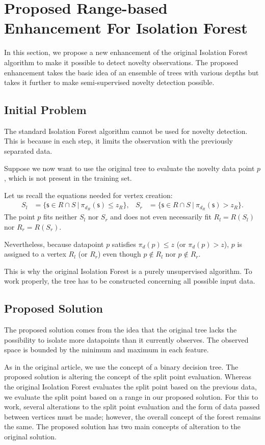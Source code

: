 \section{Proposed Range-based Enhancement For Isolation Forest}
\label{sec:novelty_isolation_forest}
In this section, we propose a new enhancement of the original Isolation Forest algorithm to make it possible to detect novelty observations.
The proposed enhancement takes the basic idea of an ensemble of trees with various depths but takes it further to make semi-supervised novelty detection possible.

\subsection{Initial Problem}
 The standard Isolation Forest algorithm cannot be used for novelty detection. This is because in each step, it limits the observation with the previously separated data.

Suppose we now want to use the original tree to evaluate the novelty data point $p$, which is not present in the training set.

Let us recall the equations needed for vertex creation:
\begin{align*}
S_l &= \{ \mathsf{s} \in{R \cap S}\ |\ \pi_{d_R}(\mathsf{s})\le z_R\},&
S_r &= \{ \mathsf{s} \in{R \cap S}\ |\ \pi_{d_R}(\mathsf{s}) > z_R\}.
\end{align*}
The point $p$ fits neither $S_l$ nor $S_r$ and does not even necessarily fit $R_l = R(S_l)$ nor $R_r = R(S_r)$. 

Nevertheless, because datapoint $p$ satisfies  $\pi_d(p) \le z$ (or $\pi_d(p) > z$), $p$ is assigned to a vertex $R_l$ (or $R_r$) even though $p \notin R_l$ nor $p \notin R_r$.

This is why the original Isolation Forest is a purely unsupervised algorithm. To work properly, the tree has to be constructed concerning all possible input data.

\subsection{Proposed Solution}
The proposed solution comes from the idea that the original tree lacks the possibility to isolate more datapoints than it currently observes.
The observed space is bounded by the minimum and maximum in each feature.

As in the original article, we use the concept of a binary decision tree. The proposed solution is altering the concept of the split point evaluation. Whereas the original Isolation Forest evaluates the split point based on the previous data, we
evaluate the split point based on a range in our proposed solution. For this to work, several alterations to the split point evaluation and the form of data passed between vertices must be made; however, the overall concept of the forest remains the same.
The proposed solution has two main concepts of alteration to the original solution.

